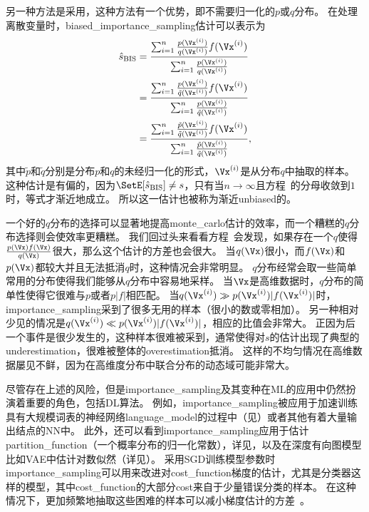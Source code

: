另一种方法是采用，这种方法有一个优势，即不需要归一化的$p$或$q$分布。
在处理离散变量时，\gls{biased_importance_sampling}估计可以表示为
\begin{align}
\label{eqn:bis}
\hat{s}_{\text{BIS}} & = \frac{\sum_{i=1}^{n} \frac{p(\Vx^{(i)})}{q(\Vx^{(i)})} f(\Vx^{(i)})}{\sum_{i=1}^{n}\frac{p(\Vx^{(i)})}{q(\Vx^{(i)})}} \\
& = \frac{\sum_{i=1}^{n} \frac{p(\Vx^{(i)})}{\tilde{q}(\Vx^{(i)})} f(\Vx^{(i)})}{\sum_{i=1}^{n}\frac{p(\Vx^{(i)})}{\tilde{q}(\Vx^{(i)})}} \\
& = \frac{\sum_{i=1}^{n} \frac{\tilde{p}(\Vx^{(i)})}{\tilde{q}(\Vx^{(i)})} f(\Vx^{(i)})}{\sum_{i=1}^{n}\frac{\tilde{p}(\Vx^{(i)})}{\tilde{q}(\Vx^{(i)})}},
\end{align}
其中$\tilde{p}$和$\tilde{q}$分别是分布${p}$和${q}$的未经归一化的形式，$\Vx^{(i)}$是从分布${q}$中抽取的样本。
这种估计是有偏的，因为$\SetE[\hat{s}_{\text{BIS}}]\neq s$，只有当$n \to \infty$且方程~的分母收敛到$1$时，等式才渐近地成立。
所以这一估计也被称为渐近\gls{unbiased}的。   


一个好的$q$分布的选择可以显著地提高\gls{monte_carlo}估计的效率，而一个糟糕的$q$分布选择则会使效率更糟糕。
我们回过头来看看方程~会发现，如果存在一个$q$使得$\frac{p(\Vx)f(\Vx)}{q(\Vx)}$很大，那么这个估计的方差也会很大。
当$q(\Vx)$很小，而$f(\Vx)$和$p(\Vx)$都较大并且无法抵消$q$时，这种情况会非常明显。
$q$分布经常会取一些简单常用的分布使得我们能够从$q$分布中容易地采样。
当$\Vx$是高维数据时，$q$分布的简单性使得它很难与$p$或者$p\vert f\vert$相匹配。   
当$q(\Vx^{(i)})\gg p(\Vx^{(i)}) \vert f(\Vx^{(i)})\vert $时，\gls{importance_sampling}采到了很多无用的样本（很小的数或零相加）。
另一种相对少见的情况是$q(\Vx^{(i)})\ll p(\Vx^{(i)}) \vert f(\Vx^{(i)})\vert $，相应的比值会非常大。
正因为后一个事件是很少发生的，这种样本很难被采到，通常使得对$s$的估计出现了典型的\gls{underestimation}，很难被整体的\gls{overestimation}抵消。
这样的不均匀情况在高维数据屡见不鲜，因为在高维度分布中联合分布的动态域可能非常大。


尽管存在上述的风险，但是\gls{importance_sampling}及其变种在\gls{ML}的应用中仍然扮演着重要的角色，包括\gls{DL}算法。
例如，\gls{importance_sampling}被应用于加速训练具有大规模词表的神经网络\gls{language_model}的过程中（见）或者其他有着大量输出结点的\gls{NN}中。   
此外，还可以看到\gls{importance_sampling}应用于估计\gls{partition_function}（一个概率分布的归一化常数），详见，以及在深度有向图模型比如\gls{VAE}中估计对数似然（详见）。
采用\gls{SGD}训练模型参数时\gls{importance_sampling}可以用来改进对\gls{cost_function}梯度的估计，尤其是分类器这样的模型，其中\gls{cost_function}的大部分\gls{cost}来自于少量错误分类的样本。    
在这种情况下，更加频繁地抽取这些困难的样本可以减小梯度估计的方差~\citep{Hinton06}。 


